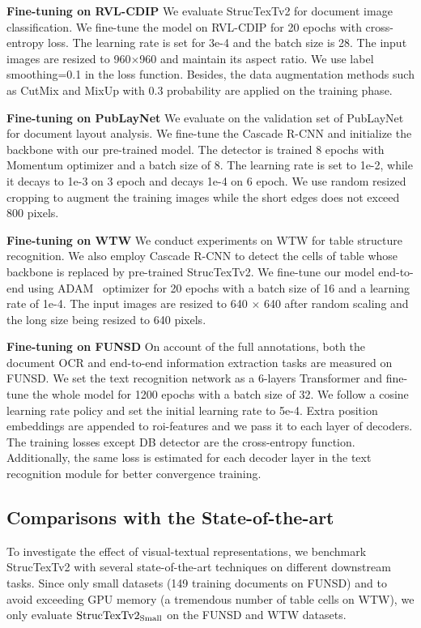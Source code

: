 \documentclass{article} %
\begin{document}
\noindent\textbf{Fine-tuning on RVL-CDIP} We evaluate StrucTexTv2 for document image classification. We fine-tune the model on RVL-CDIP for 20 epochs with cross-entropy loss. The learning rate is set for 3e-4 and the batch size is 28. The input images are resized to 960$\times$960 and maintain its aspect ratio. We use label smoothing=0.1 in the loss function. Besides, the data augmentation methods such as CutMix and MixUp with 0.3 probability are applied on the training phase.

\noindent\textbf{Fine-tuning on PubLayNet} We evaluate on the validation set of PubLayNet for document layout analysis. We fine-tune the Cascade R-CNN and initialize the backbone with our pre-trained model. The detector is trained 8 epochs with Momentum optimizer and a batch size of 8. The learning rate is set to 1e-2, while it decays to 1e-3 on 3 epoch and decays 1e-4 on 6 epoch. We use random resized cropping to augment the training images while the short edges does not exceed 800 pixels.

\noindent\textbf{Fine-tuning on WTW} We conduct experiments on WTW for table structure recognition. We also employ Cascade R-CNN to detect the cells of table whose backbone is replaced by pre-trained StrucTexTv2. We fine-tune our model end-to-end using ADAM~\cite{kingma2014adam} optimizer for 20 epochs with a batch size of 16 and a learning rate of 1e-4. The input images are resized to 640 $\times$ 640 after random scaling and the long size being resized to 640 pixels.

\noindent\textbf{Fine-tuning on FUNSD} On account of the full annotations, both the document OCR and end-to-end information extraction tasks are measured on FUNSD. We set the text recognition network as a 6-layers Transformer and fine-tune the whole model for 1200 epochs with a batch size of 32. We follow a cosine learning rate policy and set the initial learning rate to 5e-4. Extra position embeddings are appended to roi-features and we pass it to each layer of decoders. The training losses except DB detector are the cross-entropy function. Additionally, the same loss is estimated for each decoder layer in the text recognition module for better convergence training.

\subsection{Comparisons with the State-of-the-art}
To investigate the effect of visual-textual representations, we benchmark StrucTexTv2 with several state-of-the-art techniques on different downstream tasks. Since only small datasets (149 training documents on FUNSD) and to avoid exceeding GPU memory (a tremendous number of table cells on WTW), we only evaluate $\rm StrucTexTv2_{Small}$ on the FUNSD and WTW datasets.
\end{document}
